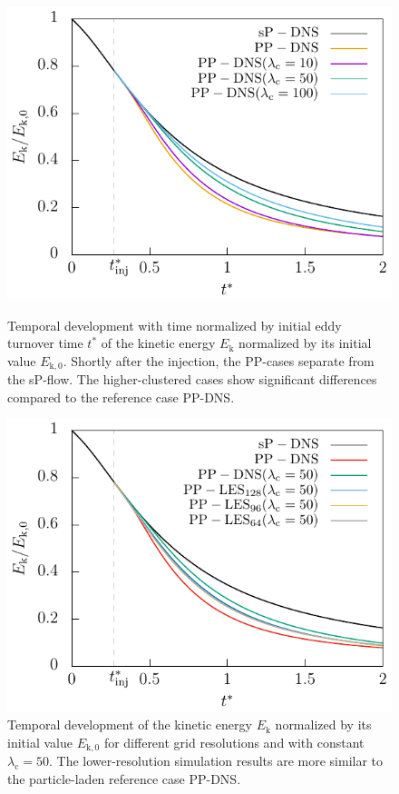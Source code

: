 \documentclass[11pt,a4paper,openany,oneside,parskip=half*]{article}
\begin{document}
    \begin{figure}[]
    \centering
    \begin{minipage}[t]{0.5\textwidth}
        \centering
 	   \includegraphics[width=\linewidth]{./Abbildungen/256/kineticEnergy_time.pdf}
	   \caption{Temporal development with time normalized by initial eddy turnover time $t^*$ of the kinetic energy $E_\mathrm{k}$ normalized by its initial value $E_\mathrm{k,0}$. Shortly after the injection, the PP-cases separate from the sP-flow. The higher-clustered cases show significant differences compared to the reference case PP-DNS.}
	\label{kineticEnergy_time_256}
    \end{minipage}%
\begin{minipage}[t]{0.5\textwidth}
        \centering
        \includegraphics[width=\linewidth]{./Abbildungen/256/kineticEnergy_comp50.pdf}
        \caption{Temporal development of the kinetic energy $E_\mathrm{k}$ normalized by its initial value $E_\mathrm{k,0}$ for different grid resolutions and with constant $\lambda_\mathrm{c}=50$. The lower-resolution simulation results are more similar to the particle-laden reference case PP-DNS.}
        \label{comparison_LES_DNS}
    \end{minipage}
\end{figure}
\end{document}
